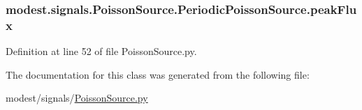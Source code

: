 \subsubsection[{\texorpdfstring{peak\+Flux}{peakFlux}}]{\setlength{\rightskip}{0pt plus 5cm}modest.\+signals.\+Poisson\+Source.\+Periodic\+Poisson\+Source.\+peak\+Flux}\hypertarget{classmodest_1_1signals_1_1PoissonSource_1_1PeriodicPoissonSource_a44c7ed0d9a35c092f8a9ce3c2b94e011}{}\label{classmodest_1_1signals_1_1PoissonSource_1_1PeriodicPoissonSource_a44c7ed0d9a35c092f8a9ce3c2b94e011}


Definition at line 52 of file Poisson\+Source.\+py.



The documentation for this class was generated from the following file\+:\begin{DoxyCompactItemize}
\item 
modest/signals/\hyperlink{PoissonSource_8py}{Poisson\+Source.\+py}\end{DoxyCompactItemize}
